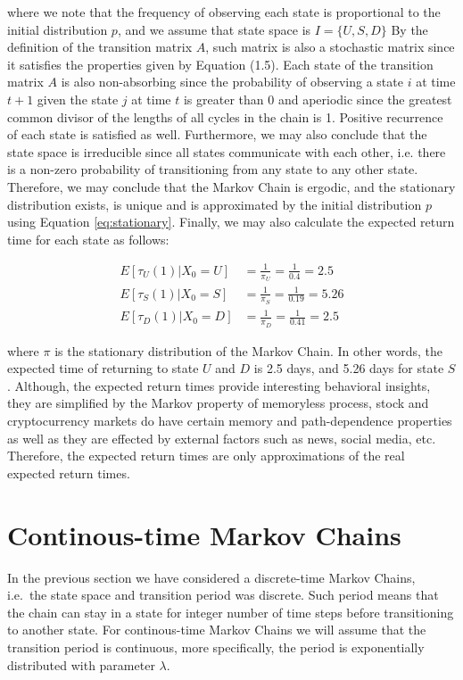 where we note that the frequency of observing each state is proportional to the initial distribution $p$, and we assume that state space is $I = \{U,S,D\}$ 
By the definition of the transition matrix $A$, such matrix is also a stochastic matrix since it satisfies the properties given by Equation (1.5).
Each state of the transition matrix $A$ is also non-absorbing since the probability of observing a state $i$ at time $t+1$ given the state $j$ at time $t$ is greater than 0 
and aperiodic since the greatest common divisor of the lengths of all cycles in the chain is 1. Positive recurrence of each state is satisfied as well.
Furthermore, we may also conclude that the state space is irreducible since all states communicate with each other, i.e. there is a non-zero probability of transitioning from any state to any other state.
Therefore, we may conclude that the Markov Chain is ergodic, and the stationary distribution exists, is unique and is approximated by the initial distribution $p$ using Equation \ref{eq:stationary}.
Finally, we may also calculate the expected return time for each state as follows:

\begin{align}
    E[\tau_U(1)|X_0=U] &= \frac{1}{\pi_U} = \frac{1}{0.4} = 2.5 \\
    E[\tau_S(1)|X_0=S] &= \frac{1}{\pi_S} = \frac{1}{0.19} = 5.26 \\
    E[\tau_D(1)|X_0=D] &= \frac{1}{\pi_D} = \frac{1}{0.41} = 2.5
\end{align}

where $\pi$ is the stationary distribution of the Markov Chain. In other words, the expected time of returning to 
state $U$ and $D$ is 2.5 days, and 5.26 days for state $S$. Although, the expected return times provide interesting behavioral insights,
they are simplified by the Markov property of memoryless process, stock and cryptocurrency markets do have certain memory and path-dependence properties as well as they 
are effected by external factors such as news, social media, etc. Therefore, the expected return times are only approximations of the real expected return times.

\section{Continous-time Markov Chains} 

In the previous section we have considered a discrete-time Markov Chains, i.e.\ the state space and transition period was discrete. Such period means that 
the chain can stay in a state for integer number of time steps before transitioning to another state. 
For continous-time Markov Chains we will assume that the transition period is continuous, more specifically, the period is exponentially distributed with parameter $\lambda$.


